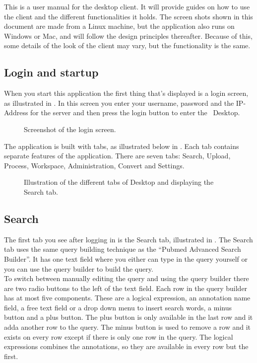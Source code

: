 This is a user manual for the desktop client. It will provide guides on how to 
use the client and the different functionalities it holds. The screen shots 
shown in this document are made from a Linux machine, but the application 
also runs on Windows or Mac, and will follow the design principles thereafter. 
Because of this, some details of the look of the client may vary, but the functionality is the same.

\subsection{Login and startup}
When you start this application the first thing that's displayed is a login screen, as illustrated in . In this screen you enter your username, password and the IP-Address for the server and then press the login button to enter the \appName\ Desktop.

\begin{figure}[h!]
	\caption{Screenshot of the login screen.}
	\label{fig:des_login-pic}
\end{figure}
The application is built with tabs, as illustrated below in . Each tab contains separate features of the application. There are seven tabs: Search, Upload, Process, Workspace, Administration, Convert and Settings.
\begin{figure}[htb]
	\caption{Illustration of the different tabs of \appName Desktop and displaying the Search tab.}
	\label{fig:des_tabs-view}
\end{figure}
\FloatBarrier

\subsection{Search}
The first tab you see after logging in is the Search tab, illustrated in . The Search tab uses the same query building technique as the “Pubmed Advanced Search Builder”\cite{des_3}. It has one text field where you either can type in the query yourself or you can use the query builder to build the query. \\

To switch between manually editing the query and using the query builder there are two radio buttons to the left of the text field. Each row in the query builder has at most five components. These are a logical expression, an annotation name field, a free text field or a drop down menu to insert search words, a minus button and a plus button. The plus button is only available in the last row and it adda another row to the query. The minus button is used to remove a row and it exists on every row except if there is only one row in the query. The logical expressions combines the annotations, so they are available in every row but the first. \\

